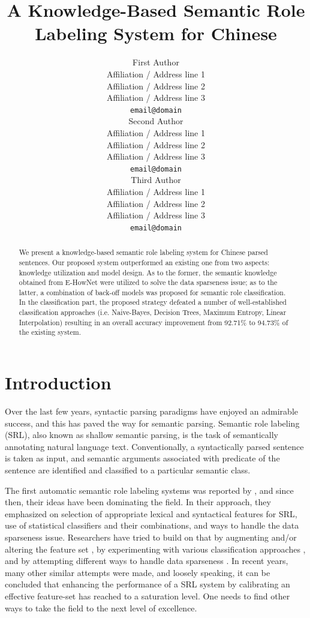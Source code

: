 \documentclass[11pt]{article}
\title{A Knowledge-Based Semantic Role Labeling System for Chinese}
\author{First Author \\
  Affiliation / Address line 1 \\
  Affiliation / Address line 2 \\
  Affiliation / Address line 3 \\
  {\tt email@domain} \\\And
  Second Author \\
  Affiliation / Address line 1 \\
  Affiliation / Address line 2 \\
  Affiliation / Address line 3 \\
  {\tt email@domain} \\\And
    Third Author \\
    Affiliation / Address line 1 \\
    Affiliation / Address line 2 \\
    Affiliation / Address line 3 \\
    {\tt email@domain} \\}
\date{}
\begin{document}
\maketitle
\begin{abstract}
We present a knowledge-based semantic role labeling system for Chinese parsed sentences. Our proposed system outperformed an existing one from two aspects: knowledge utilization and model design. As to the former, the semantic knowledge obtained from E-HowNet were utilized to solve the data sparseness issue; as to the latter, a combination of back-off models was proposed for semantic role classification. In the classification part, the proposed strategy defeated a number of well-established classification approaches (i.e. Naive-Bayes, Decision Trees, Maximum Entropy, Linear Interpolation) resulting in an overall accuracy improvement from 92.71\% to 94.73\% of the existing system.           
\end{abstract}
\section{Introduction}
Over the last few years, syntactic parsing paradigms have enjoyed an admirable success, and this has paved the way for semantic parsing. Semantic role labeling (SRL), also known as shallow semantic parsing, is the task of semantically annotating natural language text. Conventionally, a syntactically parsed sentence is taken as input, and semantic arguments associated with predicate of the sentence are identified and classified to a particular semantic class. 

The first automatic semantic role labeling systems was reported by \cite{Gildea:2002}, and since then, their ideas have been dominating the field. In their approach, they emphasized on selection of appropriate lexical and syntactical features for SRL, use of statistical classifiers and their combinations, and ways to handle the data sparseness issue. Researchers have tried to build on that by augmenting and/or altering the feature set \cite{Chen:2003:UDL:1119355.1119361,Xue04calibratingfeatures}, by experimenting with various classification approaches \cite{Park:2005:MEB:1706543.1706583,tan-wang-2009}, and by attempting different ways to handle data sparseness \cite{Zapirain:2007:USS:1621474.1621551,Lin:2010:CSR:1909632.1912231}. In recent years, many other similar attempts were made, and loosely speaking, it can be concluded that enhancing the performance of a SRL system by calibrating an effective feature-set has reached to a saturation level. One needs to find other ways to take the field to the next level of excellence.
\end{document}
